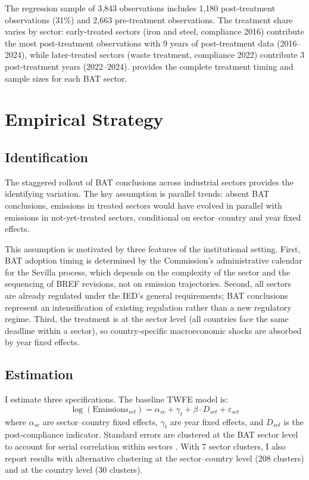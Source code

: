 \documentclass[12pt]{article}
\begin{document}
The regression sample of 3,843 observations includes 1,180 post-treatment observations (31\%) and 2,663 pre-treatment observations. The treatment share varies by sector: early-treated sectors (iron and steel, compliance 2016) contribute the most post-treatment observations with 9 years of post-treatment data (2016--2024), while later-treated sectors (waste treatment, compliance 2022) contribute 3 post-treatment years (2022--2024).  provides the complete treatment timing and sample sizes for each BAT sector.






\section{Empirical Strategy}

\subsection{Identification}

The staggered rollout of BAT conclusions across industrial sectors provides the identifying variation. The key assumption is parallel trends: absent BAT conclusions, emissions in treated sectors would have evolved in parallel with emissions in not-yet-treated sectors, conditional on sector--country and year fixed effects.

This assumption is motivated by three features of the institutional setting. First, BAT adoption timing is determined by the Commission's administrative calendar for the Sevilla process, which depends on the complexity of the sector and the sequencing of BREF revisions, not on emission trajectories. Second, all sectors are already regulated under the IED's general requirements; BAT conclusions represent an intensification of existing regulation rather than a new regulatory regime. Third, the treatment is at the sector level (all countries face the same deadline within a sector), so country-specific macroeconomic shocks are absorbed by year fixed effects.

\subsection{Estimation}

I estimate three specifications. The baseline TWFE model is:
\begin{equation}
\log(\text{Emissions}_{sct}) = \alpha_{sc} + \gamma_t + \beta \cdot D_{sct} + \varepsilon_{sct}
\label{eq:twfe}
\end{equation}
where $\alpha_{sc}$ are sector--country fixed effects, $\gamma_t$ are year fixed effects, and $D_{sct}$ is the post-compliance indicator. Standard errors are clustered at the BAT sector level to account for serial correlation within sectors \citep{roth2023}. With 7 sector clusters, I also report results with alternative clustering at the sector--country level (208 clusters) and at the country level (30 clusters).
\end{document}
